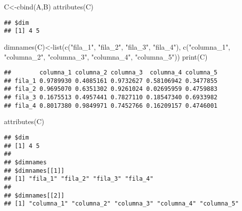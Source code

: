 \documentclass[
]{article}
\newenvironment{Shaded}{\begin{snugshade}}{\end{snugshade}}
\newcommand{\FunctionTok}[1]{\textcolor[rgb]{0.00,0.00,0.00}{#1}}
\newcommand{\NormalTok}[1]{#1}
\newcommand{\OtherTok}[1]{\textcolor[rgb]{0.56,0.35,0.01}{#1}}
\newcommand{\StringTok}[1]{\textcolor[rgb]{0.31,0.60,0.02}{#1}}
\begin{document}
\begin{Shaded}
\begin{Highlighting}[]
\NormalTok{C}\OtherTok{\textless{}{-}}\FunctionTok{cbind}\NormalTok{(A,B)}
\FunctionTok{attributes}\NormalTok{(C)}
\end{Highlighting}
\end{Shaded}

\begin{verbatim}
## $dim
## [1] 4 5
\end{verbatim}

\begin{Shaded}
\begin{Highlighting}[]
\FunctionTok{dimnames}\NormalTok{(C)}\OtherTok{\textless{}{-}}\FunctionTok{list}\NormalTok{(}\FunctionTok{c}\NormalTok{(}\StringTok{"fila\_1"}\NormalTok{, }\StringTok{"fila\_2"}\NormalTok{, }\StringTok{"fila\_3"}\NormalTok{, }\StringTok{"fila\_4"}\NormalTok{), }\FunctionTok{c}\NormalTok{(}\StringTok{"columna\_1"}\NormalTok{, }\StringTok{"columna\_2"}\NormalTok{, }\StringTok{"columna\_3"}\NormalTok{, }\StringTok{"columna\_4"}\NormalTok{, }\StringTok{"columna\_5"}\NormalTok{))}
\FunctionTok{print}\NormalTok{(C)}
\end{Highlighting}
\end{Shaded}

\begin{verbatim}
##        columna_1 columna_2 columna_3  columna_4 columna_5
## fila_1 0.9789930 0.4085161 0.9732627 0.58106942 0.3477855
## fila_2 0.9695070 0.6351302 0.9261024 0.02695959 0.4759883
## fila_3 0.1675513 0.4957441 0.7827110 0.18547340 0.6933982
## fila_4 0.8017380 0.9849971 0.7452766 0.16209157 0.4746001
\end{verbatim}

\begin{Shaded}
\begin{Highlighting}[]
\FunctionTok{attributes}\NormalTok{(C)}
\end{Highlighting}
\end{Shaded}

\begin{verbatim}
## $dim
## [1] 4 5
## 
## $dimnames
## $dimnames[[1]]
## [1] "fila_1" "fila_2" "fila_3" "fila_4"
## 
## $dimnames[[2]]
## [1] "columna_1" "columna_2" "columna_3" "columna_4" "columna_5"
\end{verbatim}
\end{document}
